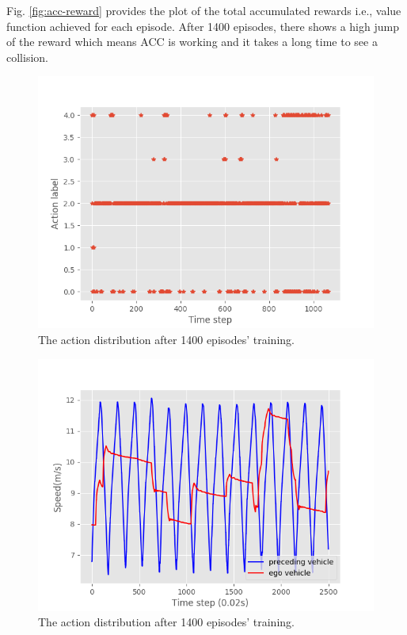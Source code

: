 Fig. \ref{fig:acc-reward} provides the plot of the total accumulated rewards i.e., value function achieved for each episode. After 1400 episodes, there shows a high jump of the reward which means ACC is working and it takes a long time to see a collision.

\begin{figure}[h]
\centering
\includegraphics[width=1.0\textwidth]{figs/ch5/action_distribution}
\caption{The action distribution after 1400 episodes' training.}
\label{fig:acc-action}
\end{figure}

\begin{figure}[h]
\centering
\includegraphics[width=1.0\textwidth]{figs/ch5/vel_variance}
\caption{The action distribution after 1400 episodes' training.}
\label{fig:acc-vel}
\end{figure}

